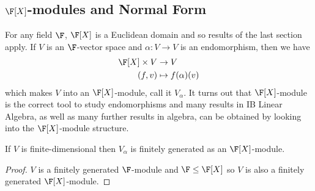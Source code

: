 \documentclass[a4paper]{article}
\theoremstyle{definition}
\begin{document}
\subsection{\texorpdfstring{\(\F[X]\)}{𝔽[X]}-modules and Normal Form}

For any field \(\F\), \(\F[X]\) is a Euclidean domain and so results of the last section apply. If \(V\) is an \(\F\)-vector space and \(\alpha: V \to V\) is an endomorphism, then we have
\begin{align*}
  \F[X] \times V &\to V \\
  (f, v) &\mapsto f(\alpha)(v)
\end{align*}
which makes \(V\) into an \(\F[X]\)-module, call it \(V_\alpha\). It turns out that \(\F[X]\)-module is the correct tool to study endomorphisms and many results in IB Linear Algebra, as well as many further results in algebra, can be obtained by looking into the \(\F[X]\)-module structure.

\begin{lemma}
  If \(V\) is finite-dimensional then \(V_\alpha\) is finitely generated as an \(\F[X]\)-module.
\end{lemma}

\begin{proof}
  \(V\) is a finitely generated \(\F\)-module and \(\F \leq \F[X]\) so \(V\) is also a finitely generated \(\F[X]\)-module.
\end{proof}
\end{document}
